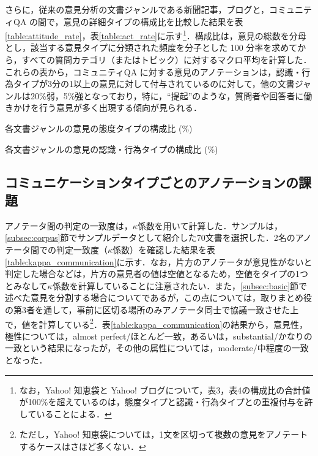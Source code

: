 \documentclass[japanese]{jnlp_1.4}
\begin{document}
さらに，従来の意見分析の文書ジャンルである新聞記事，ブログと，コミュニティQA の間で，意見の詳細タイプの構成比を比較した結果を表\ref{table:attitude_rate}，表\ref{table:act_rate}に示す\footnote{なお，Yahoo! 知恵袋と Yahoo! ブログについて，表3，表4の構成比の合計値が100\%を超えているのは，態度タイプと認識・行為タイプとの重複付与を許していることによる．}．構成比は，意見の総数を分母とし，該当する意見タイプに分類された頻度を分子とした 100 分率を求めてから，すべての質問カテゴリ（またはトピック）に対するマクロ平均を計算した．これらの表から，コミュニティQA に対する意見のアノテーションは，認識・行為タイプが3分の1以上の意見に対して付与されているのに対して，他の文書ジャンルは20\%弱，5\%強となっており，特に，``提起''のような，質問者や回答者に働きかけを行う意見が多く出現する傾向が見られる．

\begin{table}[b]
\caption{各文書ジャンルの意見の態度タイプの構成比 (\%) }
\label{table:attitude_rate}

\end{table}
\begin{table}[b]
\caption{各文書ジャンルの意見の認識・行為タイプの構成比 (\%) }
\label{table:act_rate}

\end{table}


\subsection{コミュニケーションタイプごとのアノテーションの課題}
\label{subsec:communication_annotation}

アノテータ間の判定の一致度は，$\kappa$係数\cite{cohen1960}を用いて計算した．サンプルは，\ref{subsec:corpus}節でサンプルデータとして紹介した70文書を選択した．2名のアノテータ間での判定一致度（$\kappa$係数）を確認した結果を表\ref{table:kappa_communication}に示す．なお，片方のアノテータが意見性がないと判定した場合などは，片方の意見者の値は空値となるため，空値をタイプの1つとみなして$\kappa$係数を計算していることに注意されたい．また，\ref{subsec:basic}節で述べた意見を分割する場合についてであるが，この点については，取りまとめ役の第3者を通して，事前に区切る場所のみアノテータ同士で協議一致させた上で，値を計算している\footnote{ただし，Yahoo! 知恵袋については，1文を区切って複数の意見をアノテートするケースはさほど多くない．}．表\ref{table:kappa_communication}の結果から，意見性，極性については，almost perfect/ほとんど一致，あるいは，substantial/かなりの一致\cite{landis1977}という結果になったが，その他の属性については，moderate/中程度の一致となった．
\end{document}
